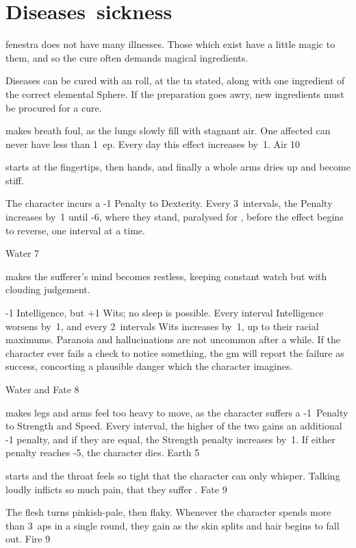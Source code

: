 \section[Diseases]{Diseases~\gls{sickness}}
\label{diseases}

\begin{multicols}{2}
\renewcommand\npcsymbol{\glsentrytext{sickness}}

\noindent
\Gls{fenestra} does not have many illnesses.
Those which exist have a little magic to them, and so the cure often demands magical \glspl{ingredient}.

Diseases can be cured with an  roll, at the \gls{tn} stated, along with one \gls{ingredient} of the correct elemental Sphere.
If the preparation goes awry, new \glspl{ingredient} must be procured for a cure.

%
  {makes breath foul, as the lungs slowly fill with stagnant air.
    One affected can never have less than 1~\gls{ep}.
    Every day this effect increases by~1.
  }%
  {Air}%
  {10}

%
  {starts at the fingertips, then hands, and finally a whole arms dries up and become stiff.

    The character incurs a -1 Penalty to Dexterity.
    Every 3~\glspl{interval}, the Penalty increases by~1 until -6, where they stand, paralysed for , before the effect begins to reverse, one \gls{interval} at a time.}%
  {Water}%
  {7}

%
  {makes the sufferer's mind becomes restless, keeping constant watch but with clouding judgement.

    -1 Intelligence, but +1 Wits; no sleep is possible.
    Every \gls{interval} Intelligence worsens by~1, and every 2~\glspl{interval} Wits increases by~1, up to their racial maximums.%
    Paranoia and hallucinations are not uncommon after a while.
    If the character ever fails a check to notice something, the \gls{gm} will report the failure as success, concocting a plausible danger which the character imagines.}%
  {Water and Fate}%
  {8}

%
  {makes legs and arms feel too heavy to move, as the character suffers a -1~Penalty to Strength and Speed.
  Every \gls{interval}, the higher of the two gains an additional -1 penalty, and if they are equal, the Strength penalty increases by~1.
  If either penalty reaches -5, the character dies.}%
  {Earth}%
  {5}

%
  {starts and the throat feels so tight that the character can only whisper.
  Talking loudly inflicts so much pain, that they suffer .}%
  {Fate}%
  {9}

%
  {The flesh turns pinkish-pale, then flaky.
  Whenever the character spends more than 3~\glspl{ap} in a single round, they gain  as the skin splits and hair begins to fall out.}%
  {Fire}%
  {9}

\end{multicols}
